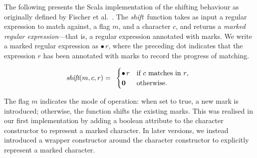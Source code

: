 \documentclass[12pt]{article}
\newcommand{\ZERO}{\textbf{0}}
\newcommand{\shift}{\textit{shift}}
\newcommand{\Marked}[1]{\bullet\,#1}
\begin{document}
The following presents the Scala implementation of the shifting behaviour as originally defined by Fischer et al.~\cite{Fischer2010}.
The \shift\ function takes as input a regular expression to match against, a flag $m$, and a character $c$, and returns a \emph{marked
regular expression}—that is, a regular expression annotated with marks. We write a marked regular expression as $\bullet\,r$, where the 
preceding dot indicates that the expression $r$ has been annotated with marks to record the progress of matching.


\[
\renewcommand{\arraystretch}{1.5}
\shift(m, c, r) =
\begin{array}{l}
  \begin{cases}
    \Marked{r} & \text{if $c$ matches in $r$}, \\
    \ZERO\, & \text{otherwise.}
  \end{cases}
\end{array}
\renewcommand{\arraystretch}{1.0}
\]

The flag $m$ indicates the mode of operation: when set to true, a new mark is introduced; otherwise, the function shifts the existing marks.  
This was realised in our first implementation by adding a boolean attribute to the character constructor to represent a marked character.  
In later versions, we instead introduced a wrapper constructor around the character constructor to explicitly represent a marked character.
\end{document}
